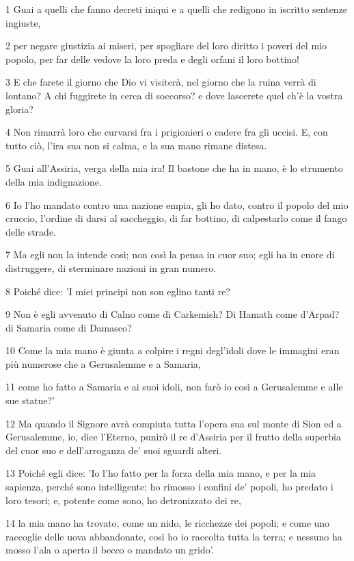 \par 1 Guai a quelli che fanno decreti iniqui e a quelli che redigono in iscritto sentenze ingiuste,
\par 2 per negare giustizia ai miseri, per spogliare del loro diritto i poveri del mio popolo, per far delle vedove la loro preda e degli orfani il loro bottino!
\par 3 E che farete il giorno che Dio vi visiterà, nel giorno che la ruina verrà di lontano? A chi fuggirete in cerca di soccorso? e dove lascerete quel ch'è la vostra gloria?
\par 4 Non rimarrà loro che curvarsi fra i prigionieri o cadere fra gli uccisi. E, con tutto ciò, l'ira sua non si calma, e la sua mano rimane distesa.
\par 5 Guai all'Assiria, verga della mia ira! Il bastone che ha in mano, è lo strumento della mia indignazione.
\par 6 Io l'ho mandato contro una nazione empia, gli ho dato, contro il popolo del mio cruccio, l'ordine di darsi al saccheggio, di far bottino, di calpestarlo come il fango delle strade.
\par 7 Ma egli non la intende così; non così la pensa in cuor suo; egli ha in cuore di distruggere, di sterminare nazioni in gran numero.
\par 8 Poiché dice: 'I miei principi non son eglino tanti re?
\par 9 Non è egli avvenuto di Calno come di Carkemish? Di Hamath come d'Arpad? di Samaria come di Damasco?
\par 10 Come la mia mano è giunta a colpire i regni degl'idoli dove le immagini eran più numerose che a Gerusalemme e a Samaria,
\par 11 come ho fatto a Samaria e ai suoi idoli, non farò io così a Gerusalemme e alle sue statue?'
\par 12 Ma quando il Signore avrà compiuta tutta l'opera sua sul monte di Sion ed a Gerusalemme, io, dice l'Eterno, punirò il re d'Assiria per il frutto della superbia del cuor suo e dell'arroganza de' suoi sguardi alteri.
\par 13 Poiché egli dice: 'Io l'ho fatto per la forza della mia mano, e per la mia sapienza, perché sono intelligente; ho rimosso i confini de' popoli, ho predato i loro tesori; e, potente come sono, ho detronizzato dei re,
\par 14 la mia mano ha trovato, come un nido, le ricchezze dei popoli; e come uno raccoglie delle uova abbandonate, così ho io raccolta tutta la terra; e nessuno ha mosso l'ala o aperto il becco o mandato un grido'.
